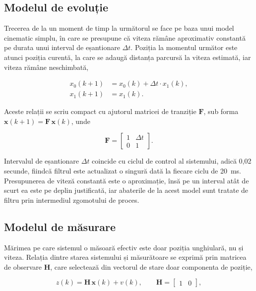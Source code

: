 \subsection{Modelul de evoluție}

Trecerea de la un moment de timp la următorul se face pe baza unui model cinematic
simplu, în care se presupune că viteza rămâne aproximativ constantă pe durata unui
interval de eșantionare $\Delta t$. Poziția la momentul următor este atunci poziția
curentă, la care se adaugă distanța parcursă la viteza estimată, iar viteza rămâne
neschimbată,

\begin{align}
\label{eq:kalman-evolutie}
x_0(k+1) &= x_0(k) + \Delta t \cdot x_1(k) , \\
x_1(k+1) &= x_1(k) .
\end{align}

Aceste relații se scriu compact cu ajutorul matricei de tranziție $\mathbf{F}$,
sub forma $\mathbf{x}(k+1) = \mathbf{F}\,\mathbf{x}(k)$, unde

\begin{equation}
\label{eq:kalman-F}
\mathbf{F} =
\begin{bmatrix} 1 & \Delta t \\ 0 & 1 \end{bmatrix} .
\end{equation}

Intervalul de eșantionare $\Delta t$ coincide cu ciclul de control al sistemului,
adică 0,02 secunde, fiindcă filtrul este actualizat o singură dată la fiecare ciclu
de 20~ms. Presupunerea de viteză constantă este o aproximație, însă pe un interval
atât de scurt ea este pe deplin justificată, iar abaterile de la acest model sunt
tratate de filtru prin intermediul zgomotului de proces.

\subsection{Modelul de măsurare}

Mărimea pe care sistemul o măsoară efectiv este doar poziția unghiulară, nu și
viteza. Relația dintre starea sistemului și măsurătoare se exprimă prin matricea de
observare $\mathbf{H}$, care selectează din vectorul de stare doar componenta de
poziție,

\begin{equation}
\label{eq:kalman-H}
z(k) = \mathbf{H}\,\mathbf{x}(k) + v(k) , \qquad
\mathbf{H} = \begin{bmatrix} 1 & 0 \end{bmatrix} ,
\end{equation}


